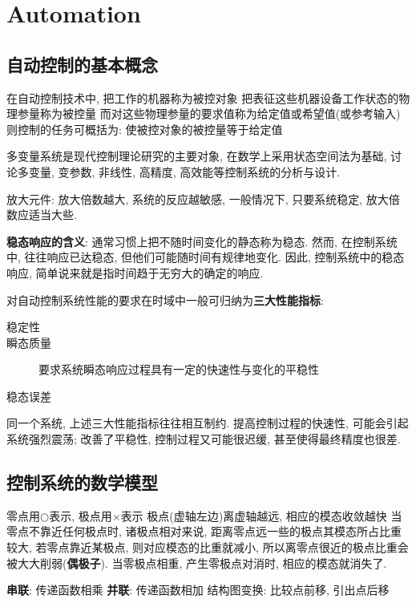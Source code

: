 \chapter{Automation}
\section{自动控制的基本概念}
在自动控制技术中, 把工作的机器称为被控对象
把表征这些机器设备工作状态的物理参量称为被控量
而对这些物理参量的要求值称为给定值或希望值(或参考输入)
则控制的任务可概括为: 使被控对象的被控量等于给定值

多变量系统是现代控制理论研究的主要对象, 在数学上采用状态空间法为基础, 讨论多变量, 变参数, 非线性, 高精度, 高效能等控制系统的分析与设计.

放大元件: 放大倍数越大, 系统的反应越敏感, 一般情况下, 只要系统稳定, 放大倍数应适当大些.

\textbf{稳态响应的含义}: 通常习惯上把不随时间变化的静态称为稳态. 然而, 在控制系统中, 往往响应已达稳态, 但他们可能随时间有规律地变化. 因此, 控制系统中的稳态响应, 简单说来就是指时间趋于无穷大的确定的响应.

对自动控制系统性能的要求在时域中一般可归纳为\textbf{三大性能指标}:
\begin{description}
\item[稳定性]
\item[瞬态质量] 要求系统瞬态响应过程具有一定的快速性与变化的平稳性
\item[稳态误差]
\end{description}
同一个系统, 上述三大性能指标往往相互制约. 提高控制过程的快速性, 可能会引起系统强烈震荡; 改善了平稳性, 控制过程又可能很迟缓, 甚至使得最终精度也很差.

\section{控制系统的数学模型}
零点用$\bigcirc$表示, 极点用$\times$表示 \newline
极点(虚轴左边)离虚轴越远, 相应的模态收敛越快 \newline
当零点不靠近任何极点时, 诸极点相对来说, 距离零点远一些的极点其模态所占比重较大, 若零点靠近某极点, 则对应模态的比重就减小, 所以离零点很近的极点比重会被大大削弱(\textbf{偶极子}). 当零极点相重, 产生零极点对消时, 相应的模态就消失了.

\textbf{串联}: 传递函数相乘 \newline
\textbf{并联}: 传递函数相加 \newline
结构图变换: 比较点前移, 引出点后移



